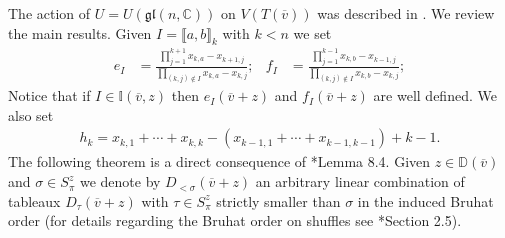 \documentclass[11pt,fleqn]{amsart}
\newcommand\CC{\mathbb C}
\newcommand\gl{\mathfrak{gl}}
\newcommand\vv{\overline{v}}
\newcommand\II{\mathbb I}
\newcommand\interval[1]{\llbracket #1 \rrbracket}
\newcommand\DD{\mathbb D}
\begin{document}
The action of $U = U(\gl(n,\CC))$ on $V(T(\vv))$ was described in 
\cite{FGRZ18}. We review the main results. Given $I = \interval{a,b}_k$ with 
$k <n$ we set
\begin{align*}
e_I
	&= \frac{\displaystyle \prod_{j = 1}^{k+1} x_{k,a} - x_{k+1,j}}
		{\displaystyle \prod_{(k,j) \notin I} x_{k,a} - x_{k,j}};
&f_I
	&= \frac{\displaystyle \prod_{j = 1}^{k-1} x_{k,b} - x_{k-1,j}}
		{\displaystyle \prod_{(k,j) \notin I} x_{k,b} - x_{k,j}};
\end{align*}
Notice that if $I \in \II(\vv,z)$ then $e_I(\vv + z)$ and $f_I(\vv + z)$ are
well defined. We also set 
\begin{align*}
h_k = x_{k,1} + \cdots + x_{k,k} - (x_{k-1, 1} + \cdots + x_{k-1,k-1}) + k - 1.
\end{align*}
The following theorem is a direct consequence of \cite{FGRZ18}*{Lemma 8.4}.
Given $z \in \DD(\vv)$ and $\sigma \in S_\pi^z$ we denote by $D_{<\sigma}(\vv 
+ z)$ an arbitrary linear combination of tableaux $D_\tau(\vv + z)$ with 
$\tau \in S_\pi^z$ strictly smaller than $\sigma$ in the induced Bruhat order
(for details regarding the Bruhat order on shuffles see 
\cite{BB05}*{Section 2.5}).
\end{document}
